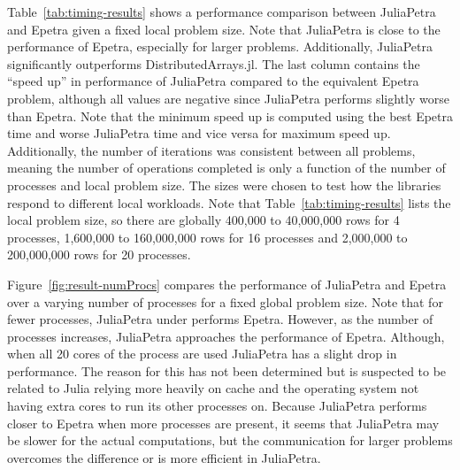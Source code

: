 \documentclass[acmsmall]{acmart}
\begin{document}
	Table~\ref{tab:timing-results} shows a performance comparison between JuliaPetra and Epetra given a fixed local problem size.
	Note that JuliaPetra is close to the performance of Epetra, especially for larger problems.
	Additionally, JuliaPetra significantly outperforms DistributedArrays.jl.
	The last column contains the ``speed up'' in performance of JuliaPetra compared to the equivalent Epetra problem, although all values are negative since JuliaPetra performs slightly worse than Epetra.
	Note that the minimum speed up is computed using the best Epetra time and worse JuliaPetra time and vice versa for maximum speed up.
	Additionally, the number of iterations was consistent between all problems, meaning the number of operations completed is only a function of the number of processes and local problem size.
	The sizes were chosen to test how the libraries respond to different local workloads.
	Note that Table~\ref{tab:timing-results} lists the local problem size, so there are globally 400,000 to 40,000,000 rows for 4 processes, 1,600,000 to 160,000,000 rows for 16 processes and 2,000,000 to 200,000,000 rows for 20 processes.

	Figure~\ref{fig:result-numProcs} compares the performance of JuliaPetra and Epetra over a varying number of processes for a fixed global problem size.
	Note that for fewer processes, JuliaPetra under performs Epetra.
	However, as the number of processes increases, JuliaPetra approaches the performance of Epetra.
	Although, when all 20 cores of the process are used JuliaPetra has a slight drop in performance.
	The reason for this has not been determined but is suspected to be related to Julia relying more heavily on cache and the operating system not having extra cores to run its other processes on.
	Because JuliaPetra performs closer to Epetra when more processes are present, it seems that JuliaPetra may be slower for the actual computations, but the communication for larger problems overcomes the difference or is more efficient in JuliaPetra.
	
\end{document}
